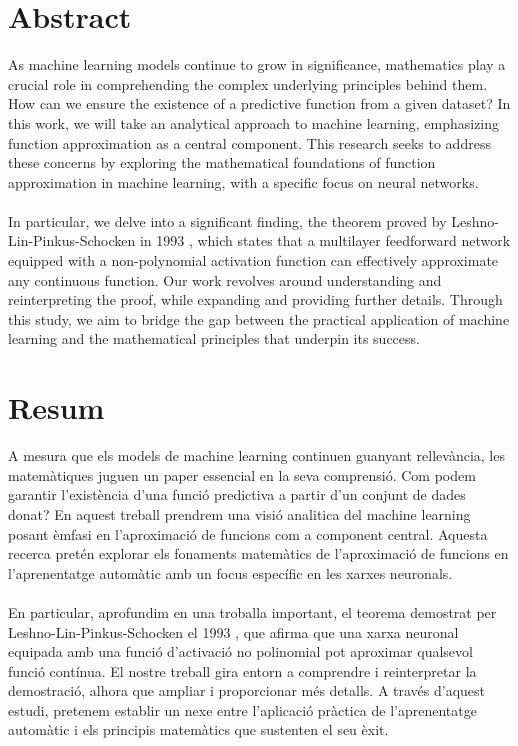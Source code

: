 \documentclass[../../main.tex]{subfiles}
\begin{document}
\section*{Abstract} %


\noindent As machine learning models continue to grow in significance, mathematics play a crucial role in comprehending the complex underlying principles behind them. How can we ensure the existence of a predictive function from a given dataset? In this work, we will take an analytical approach to machine learning, emphasizing function approximation as a central component. This research seeks to address these concerns by exploring the mathematical foundations of function approximation in machine learning, with a specific focus on neural networks.
\\ \\
In particular, we delve into a significant finding, the theorem proved by Leshno-Lin-Pinkus-Schocken in 1993 \cite{leshno1993multilayer}, which states that a multilayer feedforward network equipped with a non-polynomial activation function can effectively approximate any continuous function. Our work revolves around understanding and reinterpreting the proof, while expanding and providing further details.
Through this study, we aim to bridge the gap between the practical application of machine learning and the mathematical principles that underpin its success.

\newpage

\section*{Resum}
\noindent A mesura que els models de machine learning continuen guanyant rellevància, les matemàtiques juguen un paper essencial en la seva comprensió. Com podem garantir l'existència d'una funció predictiva a partir d'un conjunt de dades donat?  En aquest treball prendrem una visió analitica del machine learning posant èmfasi en l'aproximació de funcions com a component central. Aquesta recerca pretén explorar els fonaments matemàtics de l'aproximació de funcions en l'aprenentatge automàtic amb un focus específic en les xarxes neuronals.
\\ \\
\noindent En particular, aprofundim en una troballa important, el teorema demostrat per Leshno-Lin-Pinkus-Schocken el 1993 \cite{leshno1993multilayer}, que afirma que una xarxa neuronal equipada amb una funció d'activació no polinomial pot aproximar qualsevol funció contínua. El nostre treball gira entorn a comprendre i reinterpretar la demostració, alhora que ampliar i proporcionar més detalls.
A través d'aquest estudi, pretenem establir un nexe entre l'aplicació pràctica de l'aprenentatge automàtic i els principis matemàtics que sustenten el seu èxit.
\end{document}
